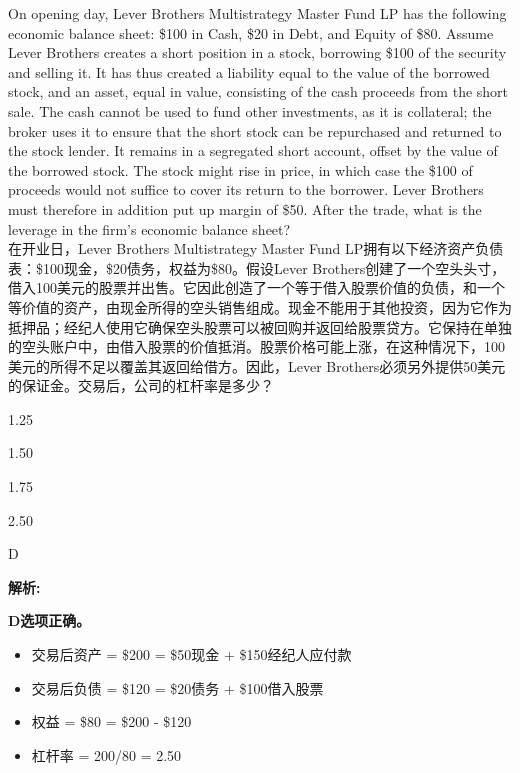 \documentclass{article}
\newcounter{question} %
\newenvironment{explanation}
{\textbf{解析:}\par}
{\par}
\begin{document}
\begin{question}
    On opening day, Lever Brothers Multistrategy Master Fund LP has the following economic balance sheet: \$100 in Cash, \$20 in Debt, and Equity of \$80. Assume Lever Brothers creates a short position in a stock, borrowing \$100 of the security and selling it. It has thus created a liability equal to the value of the borrowed stock, and an asset, equal in value, consisting of the cash proceeds from the short sale. The cash cannot be used to fund other investments, as it is collateral; the broker uses it to ensure that the short stock can be repurchased and returned to the stock lender. It remains in a segregated short account, offset by the value of the borrowed stock. The stock might rise in price, in which case the \$100 of proceeds would not suffice to cover its return to the borrower. Lever Brothers must therefore in addition put up margin of \$50. After the trade, what is the leverage in the firm's economic balance sheet?\\
    在开业日，Lever Brothers Multistrategy Master Fund LP拥有以下经济资产负债表：\$100现金，\$20债务，权益为\$80。假设Lever Brothers创建了一个空头头寸，借入100美元的股票并出售。它因此创造了一个等于借入股票价值的负债，和一个等价值的资产，由现金所得的空头销售组成。现金不能用于其他投资，因为它作为抵押品；经纪人使用它确保空头股票可以被回购并返回给股票贷方。它保持在单独的空头账户中，由借入股票的价值抵消。股票价格可能上涨，在这种情况下，100美元的所得不足以覆盖其返回给借方。因此，Lever Brothers必须另外提供50美元的保证金。交易后，公司的杠杆率是多少？
\end{question}

\begin{choices}
    \item 1.25
    \item 1.50
    \item 1.75
    \item 2.50
\end{choices}

\begin{correctanswer}
    D
\end{correctanswer}

\begin{explanation}
   
    \textbf{D选项正确。}
    \begin{itemize}
        \item 交易后资产 = \$200 = \$50现金 + \$150经纪人应付款
        \item 交易后负债 = \$120 = \$20债务 + \$100借入股票
        \item 权益 = \$80 = \$200 - \$120
        \item 杠杆率 = 200/80 = 2.50
    \end{itemize}
\end{explanation}
\end{document}
